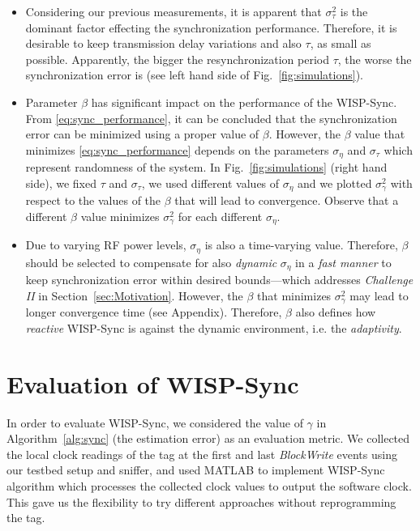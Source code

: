 \documentclass[10pt,journal,compsoc]{IEEEtran}
\begin{document}
\begin{itemize}
	\item Considering our previous measurements, it is apparent that $\sigma^2_{\tau}$ is the dominant factor effecting the synchronization performance. Therefore, it is desirable to keep transmission delay variations and also $\tau$, as small as possible. Apparently, the bigger the resynchronization period $\tau$, the worse the synchronization error is (see left hand side of Fig.~\ref{fig:simulations}). 
	
	\item Parameter $\beta$ has significant impact on the performance of the WISP-Sync. From 	\eqref{eq:sync_performance}, it can be concluded that the synchronization error can be minimized using a proper value of $\beta$. However, the $\beta$ value that minimizes 	\eqref{eq:sync_performance} depends on the parameters $\sigma_{\eta}$ and $\sigma_{\tau}$ which represent randomness of the system. In Fig.~\ref{fig:simulations} (right hand side), we fixed $\tau$ and $\sigma_{\tau}$, we used different values of $\sigma_{\eta}$ and we plotted $\sigma^2_{\gamma}$ with respect to the values of the $\beta$ that will lead to convergence. Observe that a different $\beta$ value minimizes $\sigma^2_{\gamma}$ for each different $\sigma_{\eta}$. 
	
	\item Due to varying RF power levels, $\sigma_{\eta}$ is also a time-varying value. Therefore, $\beta$ should be selected to compensate for also \emph{dynamic} $\sigma_{\eta}$ in a \emph{fast manner} to keep synchronization error within desired bounds---which addresses \emph{Challenge II} in Section~\ref{sec:Motivation}. However, the $\beta$ that minimizes $\sigma^2_{\gamma}$ may lead to longer convergence time (see Appendix). Therefore, $\beta$ also defines how \emph{reactive} WISP-Sync is against the dynamic environment, i.e. the \emph{adaptivity}.
\end{itemize}

\section{Evaluation of WISP-Sync}
\label{sec:eval-wispsync}

In order to evaluate WISP-Sync, we considered the value of $\gamma$ in Algorithm~\ref{alg:sync} (the estimation error) as an evaluation metric. We collected the local clock readings of the tag at the first and last \emph{BlockWrite} events using our testbed setup and sniffer, and used MATLAB to implement WISP-Sync algorithm which processes the collected clock values to output the software clock. This gave us the flexibility to try different approaches without reprogramming the tag.
\end{document}
